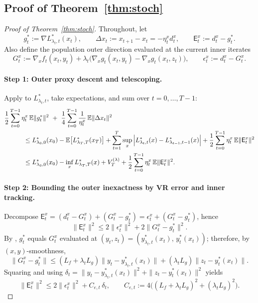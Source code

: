 \documentclass{uai2026} %
\newcommand{\EE}{\mathbb{E}}
\begin{document}
\subsection{Proof of Theorem~\ref{thm:stoch}}\label{sec:proof-stoch-thm}
\begin{proof}[Proof of Theorem~\ref{thm:stoch}]
Throughout, let
\[
g_t^{*}:=\nabla L^{*}_{\lambda_t,t}(x_t),\qquad
\Delta x_t:=x_{t+1}-x_t=-\eta_t^x d_t^x,
\qquad
\mathsf{E}_t^{x}:=d_t^x-g_t^{*}.
\]
Also define the population outer direction evaluated at the current inner iterates
\[
G_t^x:=\nabla_x f_t(x_t,y_t)+\lambda_t\big(\nabla_x g_t(x_t,y_t)-\nabla_x g_t(x_t,z_t)\big),
\qquad
\epsilon_t^x:=d_t^x-G_t^x.
\]

\paragraph{Step 1: Outer proxy descent and telescoping.}
Apply  to $L^{*}_{\lambda_t,t}$, take expectations, and sum over $t=0,\ldots,T-1$:
\begin{align}
\MoveEqLeft[3]
\frac{1}{2}\sum_{t=0}^{T-1}\eta_t^x\,\EE\|g_t^{*}\|^2
~+~\frac{1}{4}\sum_{t=0}^{T-1}\frac{1}{\eta_t^x}\,\EE\|\Delta x_t\|^2\nonumber\\
&\le
L^{*}_{\lambda_0,0}(x_0)-\EE\big[L^{*}_{\lambda_{T},T}(x_T)\big]
 +\sum_{t=1}^{T}\sup_x\Big|L^{*}_{\lambda_t,t}(x)-L^{*}_{\lambda_{t-1},t-1}(x)\Big|
 +\frac{1}{2}\sum_{t=0}^{T-1}\eta_t^x\,\EE\|\mathsf{E}_t^{x}\|^2\nonumber\\
&\le
L^{*}_{\lambda_0,0}(x_0)-\inf_x L^{*}_{\lambda_T,T}(x)
+ V_T^{(\lambda)}
+ \frac{1}{2}\sum_{t=0}^{T-1}\eta_t^x\,\EE\|\mathsf{E}_t^{x}\|^2 .
\label{eq:stoch-outer-sum}
\end{align}

\paragraph{Step 2: Bounding the outer inexactness by VR error and inner tracking.}
Decompose $\mathsf{E}_t^x=(d_t^x-G_t^x)+(G_t^x-g_t^{*})=\epsilon_t^x+(G_t^x-g_t^{*})$, hence
\[
\|\mathsf{E}_t^x\|^2\le 2\|\epsilon_t^x\|^2+2\|G_t^x-g_t^{*}\|^2.
\]
By , $g_t^{*}$ equals $G_t^x$ evaluated at $(y_t,z_t)=(y^{*}_{\lambda_t,t}(x_t),\,y_t^{*}(x_t))$; therefore, by $(x,y)$-smoothness,
\[
\|G_t^x-g_t^{*}\|
\le (L_f+\lambda_tL_g)\|y_t-y^{*}_{\lambda_t,t}(x_t)\|+(\lambda_tL_g)\|z_t-y_t^{*}(x_t)\|.
\]
Squaring and using $\delta_t=\|y_t-y^{*}_{\lambda_t,t}(x_t)\|^2+\|z_t-y_t^{*}(x_t)\|^2$ yields
\begin{equation}\label{eq:stoch-Ex-bound}
\|\mathsf{E}_t^x\|^2
\le 2\|\epsilon_t^x\|^2 + C_{e,t}\,\delta_t,
\qquad
C_{e,t}:=4\Big((L_f+\lambda_tL_g)^2+(\lambda_tL_g)^2\Big).
\end{equation}


\end{proof}
\end{document}
